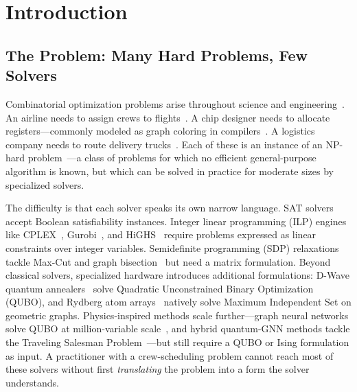 \documentclass[conference]{IEEEtran}
\begin{document}
\section{Introduction}\label{sec:intro}

\subsection{The Problem: Many Hard Problems, Few Solvers}

Combinatorial optimization problems arise throughout science and engineering~\cite{korte2008combinatorial,Schuetz2022PhysicsGNN}.
An airline needs to assign crews to flights~\cite{gopalakrishnan2005airline}.
A chip designer needs to allocate registers---commonly modeled as graph coloring in compilers~\cite{chaitin1981register}.
A logistics company needs to route delivery trucks~\cite{toth2014vehicle}.
Each of these is an instance of an NP-hard problem~\cite{karp1972,garey1979}---a class of problems for which no efficient general-purpose algorithm is known, but which can be solved in practice for moderate sizes by specialized solvers.

The difficulty is that each solver speaks its own narrow language.
SAT solvers~\cite{Een2003MiniSat, Biere2020Kissat} accept Boolean satisfiability instances.
Integer linear programming (ILP) engines like CPLEX~\cite{IBM2022CPLEX}, Gurobi~\cite{Gurobi2026}, and HiGHS~\cite{Huangfu2018HiGHS} require problems expressed as linear constraints over integer variables.
Semidefinite programming (SDP) relaxations tackle Max-Cut and graph bisection~\cite{GoemansWilliamson1995} but need a matrix formulation.
Beyond classical solvers, specialized hardware introduces additional formulations: D-Wave quantum annealers~\cite{glover2019} solve Quadratic Unconstrained Binary Optimization (QUBO), and Rydberg atom arrays~\cite{lucas2014, pichler2018, ebadi2022quantum} natively solve Maximum Independent Set on geometric graphs.
Physics-inspired methods scale further---graph neural networks solve QUBO at million-variable scale~\cite{Schuetz2022PhysicsGNN}, and hybrid quantum-GNN methods tackle the Traveling Salesman Problem~\cite{He2024QuantumTSP}---but still require a QUBO or Ising formulation as input.
A practitioner with a crew-scheduling problem cannot reach most of these solvers without first \emph{translating} the problem into a form the solver understands.
\end{document}
